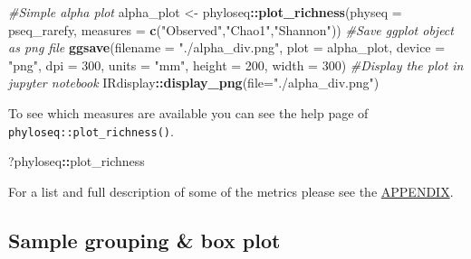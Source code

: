 \documentclass[
]{book}
\newenvironment{Shaded}{\begin{snugshade}}{\end{snugshade}}
\newcommand{\AttributeTok}[1]{\textcolor[rgb]{0.13,0.29,0.53}{#1}}
\newcommand{\CommentTok}[1]{\textcolor[rgb]{0.56,0.35,0.01}{\textit{#1}}}
\newcommand{\DecValTok}[1]{\textcolor[rgb]{0.00,0.00,0.81}{#1}}
\newcommand{\FunctionTok}[1]{\textcolor[rgb]{0.13,0.29,0.53}{\textbf{#1}}}
\newcommand{\NormalTok}[1]{#1}
\newcommand{\OtherTok}[1]{\textcolor[rgb]{0.56,0.35,0.01}{#1}}
\newcommand{\SpecialCharTok}[1]{\textcolor[rgb]{0.81,0.36,0.00}{\textbf{#1}}}
\newcommand{\StringTok}[1]{\textcolor[rgb]{0.31,0.60,0.02}{#1}}
\begin{document}
\begin{Shaded}
\begin{Highlighting}[]
\CommentTok{\#Simple alpha plot}
\NormalTok{alpha\_plot }\OtherTok{\textless{}{-}}\NormalTok{ phyloseq}\SpecialCharTok{::}\FunctionTok{plot\_richness}\NormalTok{(}\AttributeTok{physeq =}\NormalTok{ pseq\_rarefy, }\AttributeTok{measures =} \FunctionTok{c}\NormalTok{(}\StringTok{"Observed"}\NormalTok{,}\StringTok{"Chao1"}\NormalTok{,}\StringTok{"Shannon"}\NormalTok{))}
\CommentTok{\#Save ggplot object as png file}
\FunctionTok{ggsave}\NormalTok{(}\AttributeTok{filename =} \StringTok{"./alpha\_div.png"}\NormalTok{, }\AttributeTok{plot =}\NormalTok{ alpha\_plot,}
       \AttributeTok{device =} \StringTok{"png"}\NormalTok{, }\AttributeTok{dpi =} \DecValTok{300}\NormalTok{, }\AttributeTok{units =} \StringTok{"mm"}\NormalTok{, }\AttributeTok{height =} \DecValTok{200}\NormalTok{, }\AttributeTok{width =} \DecValTok{300}\NormalTok{)}
\CommentTok{\#Display the plot in jupyter notebook}
\NormalTok{IRdisplay}\SpecialCharTok{::}\FunctionTok{display\_png}\NormalTok{(}\AttributeTok{file=}\StringTok{"./alpha\_div.png"}\NormalTok{)}
\end{Highlighting}
\end{Shaded}

To see which measures are available you can see the help page of \texttt{phyloseq::plot\_richness()}.

\begin{Shaded}
\begin{Highlighting}[]
\NormalTok{?phyloseq}\SpecialCharTok{::}\NormalTok{plot\_richness}
\end{Highlighting}
\end{Shaded}

For a list and full description of some of the metrics please see the \protect\hyperlink{alpha_appendix}{APPENDIX}.

\hypertarget{sample-grouping-box-plot}{%
\subsection{Sample grouping \& box plot}\label{sample-grouping-box-plot}}
\end{document}
